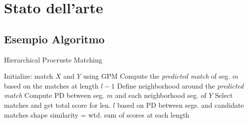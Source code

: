 \chapter{Stato dell'arte} 
\label{Cap2}

\section{Esempio Algoritmo}
\begin{algorithm}
\caption{Hierarchical Procruste Matching} 
\label{algHPM}
\begin{algorithmic}[1]
\STATE Initialize: match $X$ and $Y$ using GPM
\STATE Compute the \textsl{predicted match} of seg. $m$ based on the matches at length $l-1$
\STATE Define neighborhood around the \textsl{predicted match}
\STATE Compute PD between seg. $m$ and each neighborhood seg. of $Y$
\ENDFOR
\STATE Select matches and get total score for len. $l$ based on PD between segs. and candidate matches
\ENDFOR
\STATE shape similarity = wtd. sum of scores at each length
\end{algorithmic}
\end{algorithm}


